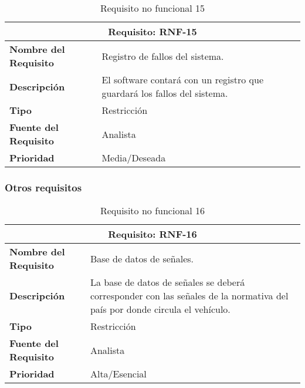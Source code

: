 \begin{table}[H]
\begin{center}
\begin{tabular}{p{} p{7cm}}
\multicolumn{2}{c}{\textbf{Requisito: RNF-15} } \\
\hline \hline
\textbf{Nombre del Requisito} & Registro de fallos del sistema.\\
\hline
\textbf{Descripción} & El software contará con un registro que guardará los fallos del sistema.\\
\hline
\textbf{Tipo} & Restricción  \\
\hline
\textbf{Fuente del Requisito} & Analista  \\
\hline
\textbf{Prioridad} & Media/Deseada \\ \hline
\end{tabular}
\caption{Requisito no funcional 15}
\label{tab:RNF-15}
\end{center}
\end{table}

\subsubsection{Otros requisitos}

\begin{table}[H]
\begin{center}
\begin{tabular}{p{} p{7cm}}
\multicolumn{2}{c}{\textbf{Requisito: RNF-16} } \\
\hline \hline
\textbf{Nombre del Requisito} & Base de datos de señales.\\
\hline
\textbf{Descripción} & La base de datos de señales se deberá corresponder con las señales de la normativa del país por donde circula el vehículo.\\
\hline
\textbf{Tipo} & Restricción  \\
\hline
\textbf{Fuente del Requisito} & Analista  \\
\hline
\textbf{Prioridad} & Alta/Esencial \\ \hline
\end{tabular}
\caption{Requisito no funcional 16}
\label{tab:RNF-16}
\end{center}
\end{table}

